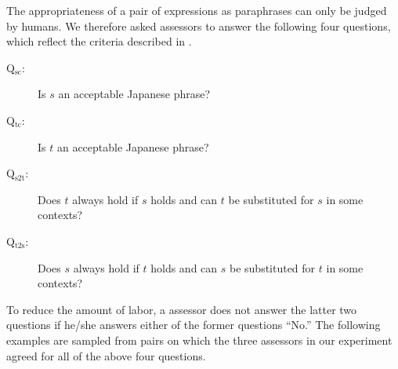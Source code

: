 \documentclass[english]{jnlp_1.4}
\begin{document}
The appropriateness of a pair of expressions as paraphrases can only
be judged by humans. We therefore asked assessors to answer the
following four questions, which reflect the criteria described in
.
\begin{description}
\item[Q$_{\textrm{sc}}$:] Is $s$ an acceptable Japanese phrase?
\item[Q$_{\textrm{tc}}$:] Is $t$ an acceptable Japanese phrase?
\item[Q$_{\textrm{s2t}}$:] Does $t$ always hold if $s$ holds and can
  $t$ be substituted for $s$ in some contexts?
\item[Q$_{\textrm{t2s}}$:] Does $s$ always hold if $t$ holds and can
  $s$ be substituted for $t$ in some contexts?
\end{description}
To reduce the amount of labor, a assessor does not answer the latter
two questions if he/she answers either of the former questions ``No.''
The following examples are sampled from pairs on which the three
assessors in our experiment agreed for all of the above four
questions.
\end{document}
